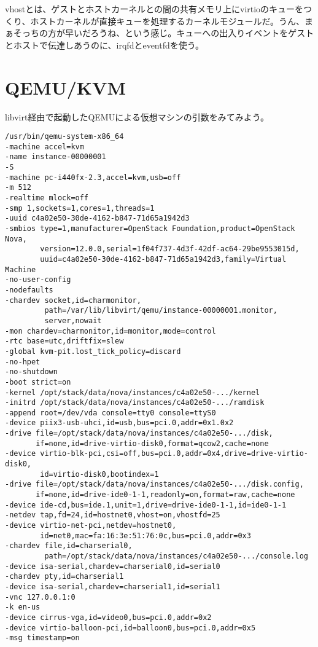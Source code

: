 \documentclass[9pt,b5paper,tombo]{jsbook}
\begin{document}
vhostとは、ゲストとホストカーネルとの間の共有メモリ上にvirtioのキューをつくり、ホストカーネルが直接キューを処理するカーネルモジュールだ。うん、まぁそっちの方が早いだろうね、という感じ。キューへの出入りイベントをゲストとホストで伝達しあうのに、irqfdとeventfdを使う。

\section{QEMU/KVM}

libvirt経由で起動したQEMUによる仮想マシンの引数をみてみよう。

\begin{lstlisting}
/usr/bin/qemu-system-x86_64
-machine accel=kvm
-name instance-00000001
-S
-machine pc-i440fx-2.3,accel=kvm,usb=off
-m 512
-realtime mlock=off
-smp 1,sockets=1,cores=1,threads=1
-uuid c4a02e50-30de-4162-b847-71d65a1942d3
-smbios type=1,manufacturer=OpenStack Foundation,product=OpenStack Nova,
        version=12.0.0,serial=1f04f737-4d3f-42df-ac64-29be9553015d,
        uuid=c4a02e50-30de-4162-b847-71d65a1942d3,family=Virtual Machine
-no-user-config
-nodefaults
-chardev socket,id=charmonitor,
         path=/var/lib/libvirt/qemu/instance-00000001.monitor,
         server,nowait
-mon chardev=charmonitor,id=monitor,mode=control
-rtc base=utc,driftfix=slew
-global kvm-pit.lost_tick_policy=discard
-no-hpet
-no-shutdown
-boot strict=on
-kernel /opt/stack/data/nova/instances/c4a02e50-.../kernel
-initrd /opt/stack/data/nova/instances/c4a02e50-.../ramdisk
-append root=/dev/vda console=tty0 console=ttyS0
-device piix3-usb-uhci,id=usb,bus=pci.0,addr=0x1.0x2
-drive file=/opt/stack/data/nova/instances/c4a02e50-.../disk,
       if=none,id=drive-virtio-disk0,format=qcow2,cache=none
-device virtio-blk-pci,csi=off,bus=pci.0,addr=0x4,drive=drive-virtio-disk0,
        id=virtio-disk0,bootindex=1
-drive file=/opt/stack/data/nova/instances/c4a02e50-.../disk.config,
       if=none,id=drive-ide0-1-1,readonly=on,format=raw,cache=none
-device ide-cd,bus=ide.1,unit=1,drive=drive-ide0-1-1,id=ide0-1-1
-netdev tap,fd=24,id=hostnet0,vhost=on,vhostfd=25
-device virtio-net-pci,netdev=hostnet0,
        id=net0,mac=fa:16:3e:51:76:0c,bus=pci.0,addr=0x3
-chardev file,id=charserial0,
         path=/opt/stack/data/nova/instances/c4a02e50-.../console.log
-device isa-serial,chardev=charserial0,id=serial0
-chardev pty,id=charserial1
-device isa-serial,chardev=charserial1,id=serial1
-vnc 127.0.0.1:0
-k en-us
-device cirrus-vga,id=video0,bus=pci.0,addr=0x2
-device virtio-balloon-pci,id=balloon0,bus=pci.0,addr=0x5
-msg timestamp=on
\end{lstlisting}
\end{document}
